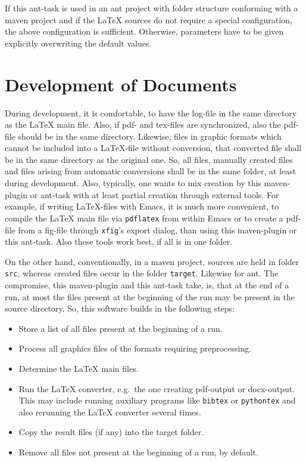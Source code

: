 If this ant-task is used in an ant project 
with folder structure conforming with a maven project 
and if the \LaTeX{} sources do not require a special configuration, 
the above configuration is sufficient. 
Otherwise, parameters have to be given explicitly 
overwriting the default values. 

\section{Development of Documents}\label{sec:devel}

During development, it is comfortable, 
to have the log-file in the same directory as the \LaTeX{} main file. 
Also, if pdf- and tex-files are synchronized, 
also the pdf-file should be in the same directory. 
Likewise, files in graphic formats 
which cannot be included into a \LaTeX-file without conversion, 
that converted file shall be in the same directory as the original one. 
So, all files, manually created files 
and files arising from automatic conversions 
shall be in the same folder, at least during development. 
Also, typically, one wants to mix creation by this maven-plugin or ant-task 
with at least partial creation through external tools. 
For example, if writing \LaTeX-files with Emacs, 
it is much more convenient, to compile the \LaTeX{} main file 
via \texttt{pdflatex} from within Emacs 
or to create a pdf-file from a \gls{fig}-file 
through \texttt{xfig}'s export dialog, 
than using this maven-plugin or this ant-task. 
Also these tools work best, if all is in one folder. 

On the other hand, 
conventionally, in a maven project, 
sources are held in folder \texttt{src}, 
whereas created files occur in the folder \texttt{target}. 
Likewise for ant. 
The compromise, this maven-plugin and this ant-task take, 
is, that at the end of a run, 
at most the files present at the beginning of the run 
may be present in the source directory. 
So, this software builds in the following steps: 
%
\begin{itemize}
\item
Store a list of all files present at the beginning of a run.
\item
Process all graphics files of the formats requiring preprocessing.
\item
Determine the \LaTeX{} main files.
\item
Run the \LaTeX{} converter, e.g.~the one creating pdf-output or docx-output.
This may include running auxiliary programs like \texttt{bibtex} or \texttt{pythontex} 
and also rerunning the \LaTeX{} converter several times. 
\item
Copy the result files (if any) into the target folder.
\item
Remove all files not present at the beginning of a run, by default. 
\end{itemize}

